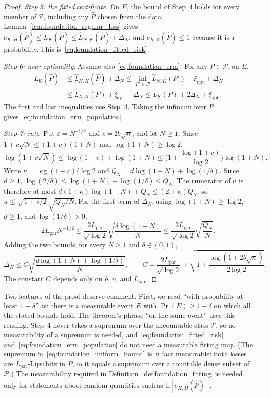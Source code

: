 \begin{proof}
\emph{Step 5: the fitted certificate.} On $E$, the bound of Step~4 holds for
every member of $\mathcal P$, including any $\widehat P$ chosen from the
data. Lemma~\ref{lem:foundation_regular_loss} gives
$e_{K,H}(\widehat P)\le L_K(\widehat P)\le\widehat L_{N,K}(\widehat P)
+\Delta_N$, and $e_{K,H}(\widehat P)\le1$ because it is a probability. This
is~\eqref{eq:foundation_fitted_risk}.

\emph{Step 6: near-optimality.} Assume also~\eqref{eq:foundation_erm}. For
any $P\in\mathcal P$, on $E$,
\begin{align*}
 L_K(\widehat P)
 &\le\widehat L_{N,K}(\widehat P)+\Delta_N
 \le\inf_{P'\in\mathcal P}\widehat L_{N,K}(P')+\xi_{\mathrm{opt}}+\Delta_N\\
 &\le\widehat L_{N,K}(P)+\xi_{\mathrm{opt}}+\Delta_N
 \le L_K(P)+2\Delta_N+\xi_{\mathrm{opt}} .
\end{align*}
The first and last inequalities use Step~4. Taking the infimum over $P$
gives~\eqref{eq:foundation_erm_population}.

\emph{Step 7: rate.} Put $\varepsilon=N^{-1/2}$ and $c=2b\sqrt n$, and let
$N\ge1$. Since $1+c\sqrt N\le(1+c)(1+N)$ and $\log(1+N)\ge\log2$,
\[
 \log(1+c\sqrt N)\le\log(1+c)+\log(1+N)
 \le\Big(1+\frac{\log(1+c)}{\log2}\Big)\log(1+N).
\]
Write $\kappa=\log(1+c)/\log2$ and
$Q_N=d\log(1+N)+\log(1/\delta)$. Since $d\ge1$,
$\log(2/\delta)\le\log(1+N)+\log(1/\delta)\le Q_N$. The numerator of $u$
is therefore at most $d(1+\kappa)\log(1+N)+Q_N\le(2+\kappa)Q_N$, so
$u\le\sqrt{1+\kappa/2}\,\sqrt{Q_N/N}$. For the first term of $\Delta_N$,
using $\log(1+N)\ge\log2$, $d\ge1$, and $\log(1/\delta)>0$,
\[
 2L_{\mathrm{par}}N^{-1/2}
 \le\frac{2L_{\mathrm{par}}}{\sqrt{\log2}}\sqrt{\frac{d\log(1+N)}{N}}
 \le\frac{2L_{\mathrm{par}}}{\sqrt{\log2}}\sqrt{\frac{Q_N}{N}} .
\]
Adding the two bounds, for every $N\ge1$ and $\delta\in(0,1)$,
\[
 \Delta_N\le C\sqrt{\frac{d\log(1+N)+\log(1/\delta)}{N}},
 \qquad
 C=\frac{2L_{\mathrm{par}}}{\sqrt{\log2}}
   +\sqrt{1+\frac{\log(1+2b\sqrt n)}{2\log2}} .
\]
The constant $C$ depends only on $b$, $n$, and $L_{\mathrm{par}}$.
\end{proof}

Two features of the proof deserve comment. First, we read ``with
probability at least $1-\delta$'' as: there is a measurable event $E$ with
$\Pr(E)\ge1-\delta$ on which all the stated bounds hold. The theorem's
phrase ``on the same event'' uses this reading. Step~4 never takes a
supremum over the uncountable class $\mathcal P$, so no measurability of a
supremum is needed, and~\eqref{eq:foundation_fitted_risk}
and~\eqref{eq:foundation_erm_population} do not need a measurable fitting
map. (The supremum in~\eqref{eq:foundation_uniform_bound} is in fact
measurable: both losses are $L_{\mathrm{par}}$-Lipschitz in $P$, so it
equals a supremum over a countable dense subset of $\mathcal P$.) The
measurability required in Definition~\ref{def:foundation_fitting} is needed
only for statements about random quantities such as
$\mathbb E[e_{K,H}(\widehat P)]$.

